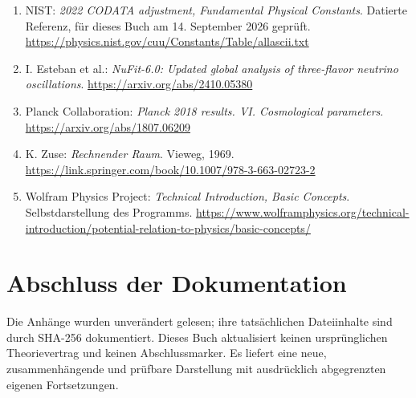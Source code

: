 \begin{enumerate}[label={E\arabic*.},leftmargin=2.4em,itemsep=7pt]
\item NIST: \emph{2022 CODATA adjustment, Fundamental Physical Constants}. Datierte Referenz, für dieses Buch am 14. September 2026 geprüft. \url{https://physics.nist.gov/cuu/Constants/Table/allascii.txt}
\item I. Esteban et al.: \emph{NuFit-6.0: Updated global analysis of three-flavor neutrino oscillations}. \url{https://arxiv.org/abs/2410.05380}
\item Planck Collaboration: \emph{Planck 2018 results. VI. Cosmological parameters}. \url{https://arxiv.org/abs/1807.06209}
\item K. Zuse: \emph{Rechnender Raum}. Vieweg, 1969. \url{https://link.springer.com/book/10.1007/978-3-663-02723-2}
\item Wolfram Physics Project: \emph{Technical Introduction, Basic Concepts}. Selbstdarstellung des Programms. \url{https://www.wolframphysics.org/technical-introduction/potential-relation-to-physics/basic-concepts/}
\end{enumerate}
\section{Abschluss der Dokumentation}
Die Anhänge wurden unverändert gelesen; ihre tatsächlichen Dateiinhalte sind durch SHA-256 dokumentiert. Dieses Buch aktualisiert keinen ursprünglichen Theorievertrag und keinen Abschlussmarker. Es liefert eine neue, zusammenhängende und prüfbare Darstellung mit ausdrücklich abgegrenzten eigenen Fortsetzungen.
